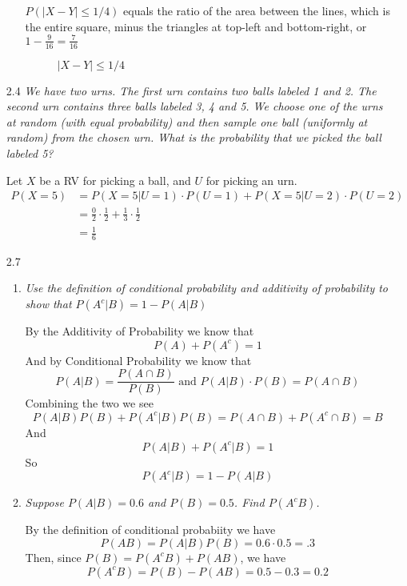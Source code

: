\documentclass[10pt]{article}
\begin{document}
\begin{itemize}
\begin{enumerate}
      $P(|X-Y| \leq 1 / 4)$ equals the ratio of the area between
      the lines, which is the entire square, minus the triangles at
      top-left and bottom-right, or $1 - \frac{9}{16}  = \frac{7}{16} $

      \begin{figure}
        \centering
        \caption{$|X-Y| \leq 1 / 4$}
      \end{figure}
  \end{enumerate}

\newpage
\item[2.4] \textit{We have two urns. The first urn contains two balls
    labeled 1 and 2. The second urn contains three balls labeled 3, 4
    and 5.  We choose one of the urns at random (with equal probability)
    and then sample one ball (uniformly at random) from the chosen urn.
    What is the probability that we picked the ball labeled 5?}

    Let $X$ be a RV for picking a ball, and $U$ for picking an urn.
    \begin{align*}
      P(X=5) &= P(X = 5 | U = 1) \cdot P(U=1) + P(X=5 | U =2) \cdot P(U=2) \\
              &= \frac{0}{2} \cdot \frac{1}{2} + \frac{1}{3}  \cdot \frac{1}{2} \\
              &= \frac{1}{6}
    \end{align*}

\newpage
\item[2.7]
  \begin{enumerate}
    \item  \emph{Use the definition of conditional probability and
      additivity of probability to show that $P(A^c |B) = 1 - P(A|B)$}

      By the Additivity of Probability we know that
      \[ P(A) + P(A^c) = 1 \]
      And by Conditional Probability we know that
      \[ P(A|B) = \frac{P(A \cap B)}{P(B)} \text{ and } P(A|B) \cdot P(B) = P(A \cap B) \]
      Combining the two we see
      \[ P(A|B)P(B) + P(A^c|B)P(B) = P(A \cap B) + P(A^c \cap B) = B \]
        And
      \[ P(A|B) + P(A^c|B) = 1 \]
      So
      \[ P(A^c|B) = 1 - P(A|B) \]

    \item \emph{Suppose $P(A|B) = 0.6$ and $P(B) = 0.5$. Find $P(A^cB)$.}

    By the definition of conditional probabiity we have
    \[ P(AB) = P(A|B)P(B) = 0.6 \cdot 0.5  = .3 \]
    Then, since $ P(B) = P(A^cB) + P(AB)$, we have
    \[ P(A^cB) = P(B) - P(AB) =  0.5 - 0.3 = 0.2 \]
  \end{enumerate}

\end{itemize}
\end{document}
